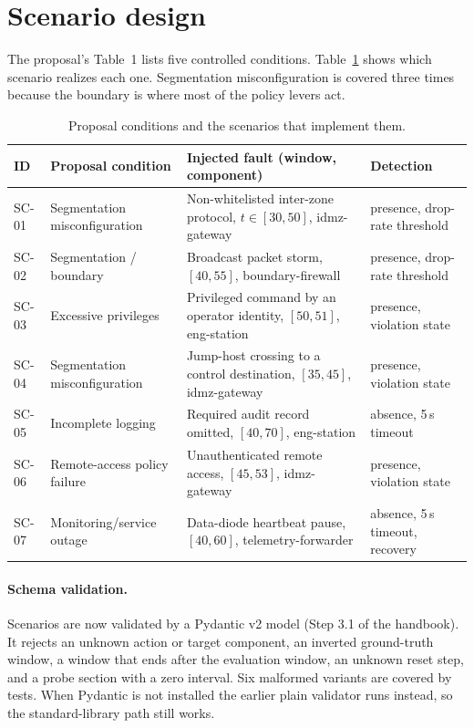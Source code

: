 \documentclass[11pt]{article}
\begin{document}
\section{Scenario design}
\label{sec:scenarios}
The proposal's Table~1 lists five controlled conditions. Table~\ref{tab:scenarios}
shows which scenario realizes each one. Segmentation misconfiguration is covered
three times because the boundary is where most of the policy levers act.

\begin{table}[h]
\centering
\caption{Proposal conditions and the scenarios that implement them.}
\label{tab:scenarios}
\small
\begin{tabular}{p{1.1cm} >{\RaggedRight\arraybackslash}p{3.7cm} >{\RaggedRight\arraybackslash}p{5.0cm} >{\RaggedRight\arraybackslash}p{3.6cm}}
\toprule
\textbf{ID} & \textbf{Proposal condition} & \textbf{Injected fault (window, component)} & \textbf{Detection}\\
\midrule
SC-01 & Segmentation misconfiguration & Non-whitelisted inter-zone protocol, $t\in[30,50]$, idmz-gateway & presence, drop-rate threshold\\
SC-02 & Segmentation / boundary & Broadcast packet storm, $[40,55]$, boundary-firewall & presence, drop-rate threshold\\
SC-03 & Excessive privileges & Privileged command by an operator identity, $[50,51]$, eng-station & presence, violation state\\
SC-04 & Segmentation misconfiguration & Jump-host crossing to a control destination, $[35,45]$, idmz-gateway & presence, violation state\\
SC-05 & Incomplete logging & Required audit record omitted, $[40,70]$, eng-station & absence, 5\,s timeout\\
SC-06 & Remote-access policy failure & Unauthenticated remote access, $[45,53]$, idmz-gateway & presence, violation state\\
SC-07 & Monitoring/service outage & Data-diode heartbeat pause, $[40,60]$, telemetry-forwarder & absence, 5\,s timeout, recovery\\
\bottomrule
\end{tabular}
\end{table}

\paragraph{Schema validation.} Scenarios are now validated by a Pydantic v2 model
(Step 3.1 of the handbook). It rejects an unknown action or target component, an
inverted ground-truth window, a window that ends after the evaluation window, an
unknown reset step, and a probe section with a zero interval. Six malformed
variants are covered by tests. When Pydantic is not installed the earlier plain
validator runs instead, so the standard-library path still works.
\end{document}
